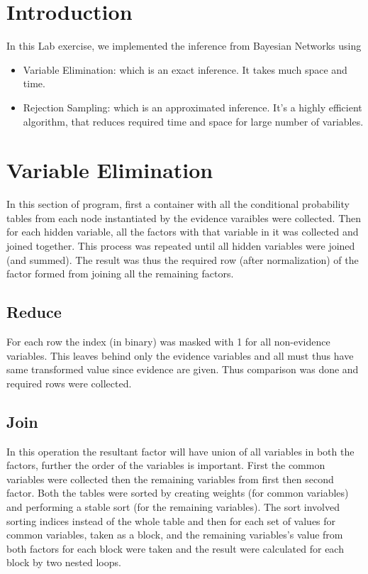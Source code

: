 \documentclass[12pt]{article}
\begin{document}
\maketitle

\section{Introduction}
In this Lab exercise, we implemented the inference from Bayesian Networks using
\begin{itemize}
    \item Variable Elimination: which is an exact inference. It takes much space and time.
    \item Rejection Sampling: which is an approximated inference. It's a highly efficient algorithm, that reduces required time and space for large number of variables.
\end{itemize}

\section{Variable Elimination}
In this section of program, first a container with all the conditional probability tables from each node instantiated by the evidence varaibles were collected. Then for each hidden variable, all the factors with that variable in it was collected and joined together. This process was repeated until all hidden variables were joined (and summed). The result was thus the required row (after normalization) of the factor formed from joining all the remaining factors.

\subsection{Reduce}
For each row the index (in binary) was masked with 1 for all non-evidence variables. This leaves behind only the evidence variables and all must thus have same transformed value since evidence are given. Thus comparison was done and required rows were collected.

\subsection{Join}
In this operation the resultant factor will have union of all variables in both the factors, further the order of the variables is important. First the common variables were collected then the remaining variables from first then second factor. Both the tables were sorted by creating weights (for common variables) and performing a stable sort (for the remaining variables). The sort involved sorting indices instead of the whole table and then for each set of values for common variables, taken as a block, and the remaining variables's value from both factors for each block were taken and the result were calculated for each block by two nested loops.
\end{document}
